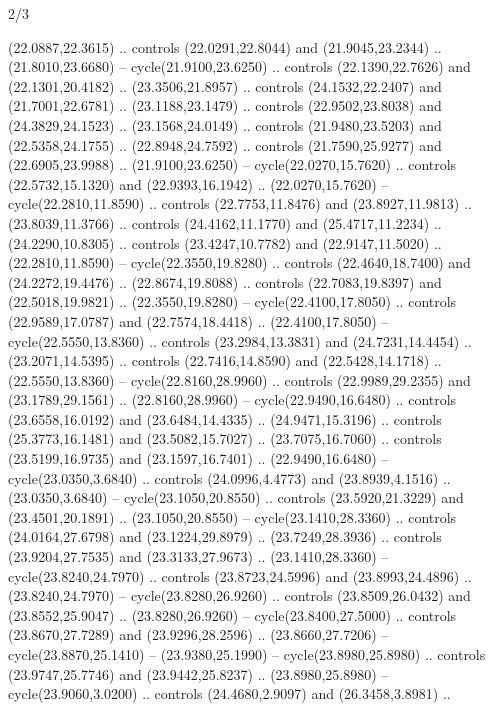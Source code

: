 \begin{flagdescription}{2/3}
\begin{scope}[yshift=\flagwidth,scale=\flagwidth/1241.93737]
\begin{scope}[y=-1mm, x=1mm,draw=gold,fill=blue,line join=miter,miter limit=4,line width=1.8\lw]
\begin{scope}[y=1mm, x=1mm, yscale=-1,shift={(573.68mm+\str,145.75)}]
\begin{scope}[scale=1.35,shift={(-9,-3)}]
\begin{scope}[scale=0.55]
\begin{scope}[scale=1.333]
    (22.0887,22.3615) .. controls (22.0291,22.8044) and (21.9045,23.2344) ..
    (21.8010,23.6680) -- cycle(21.9100,23.6250) .. controls (22.1390,22.7626) and
    (22.1301,20.4182) .. (23.3506,21.8957) .. controls (24.1532,22.2407) and
    (21.7001,22.6781) .. (23.1188,23.1479) .. controls (22.9502,23.8038) and
    (24.3829,24.1523) .. (23.1568,24.0149) .. controls (21.9480,23.5203) and
    (22.5358,24.1755) .. (22.8948,24.7592) .. controls (21.7590,25.9277) and
    (22.6905,23.9988) .. (21.9100,23.6250) -- cycle(22.0270,15.7620) .. controls
    (22.5732,15.1320) and (22.9393,16.1942) .. (22.0270,15.7620) --
    cycle(22.2810,11.8590) .. controls (22.7753,11.8476) and (23.8927,11.9813) ..
    (23.8039,11.3766) .. controls (24.4162,11.1770) and (25.4717,11.2234) ..
    (24.2290,10.8305) .. controls (23.4247,10.7782) and (22.9147,11.5020) ..
    (22.2810,11.8590) -- cycle(22.3550,19.8280) .. controls (22.4640,18.7400) and
    (24.2272,19.4476) .. (22.8674,19.8088) .. controls (22.7083,19.8397) and
    (22.5018,19.9821) .. (22.3550,19.8280) -- cycle(22.4100,17.8050) .. controls
    (22.9589,17.0787) and (22.7574,18.4418) .. (22.4100,17.8050) --
    cycle(22.5550,13.8360) .. controls (23.2984,13.3831) and (24.7231,14.4454) ..
    (23.2071,14.5395) .. controls (22.7416,14.8590) and (22.5428,14.1718) ..
    (22.5550,13.8360) -- cycle(22.8160,28.9960) .. controls (22.9989,29.2355) and
    (23.1789,29.1561) .. (22.8160,28.9960) -- cycle(22.9490,16.6480) .. controls
    (23.6558,16.0192) and (23.6484,14.4335) .. (24.9471,15.3196) .. controls
    (25.3773,16.1481) and (23.5082,15.7027) .. (23.7075,16.7060) .. controls
    (23.5199,16.9735) and (23.1597,16.7401) .. (22.9490,16.6480) --
    cycle(23.0350,3.6840) .. controls (24.0996,4.4773) and (23.8939,4.1516) ..
    (23.0350,3.6840) -- cycle(23.1050,20.8550) .. controls (23.5920,21.3229) and
    (23.4501,20.1891) .. (23.1050,20.8550) -- cycle(23.1410,28.3360) .. controls
    (24.0164,27.6798) and (23.1224,29.8979) .. (23.7249,28.3936) .. controls
    (23.9204,27.7535) and (23.3133,27.9673) .. (23.1410,28.3360) --
    cycle(23.8240,24.7970) .. controls (23.8723,24.5996) and (23.8993,24.4896) ..
    (23.8240,24.7970) -- cycle(23.8280,26.9260) .. controls (23.8509,26.0432) and
    (23.8552,25.9047) .. (23.8280,26.9260) -- cycle(23.8400,27.5000) .. controls
    (23.8670,27.7289) and (23.9296,28.2596) .. (23.8660,27.7206) --
    cycle(23.8870,25.1410) -- (23.9380,25.1990) -- cycle(23.8980,25.8980) ..
    controls (23.9747,25.7746) and (23.9442,25.8237) .. (23.8980,25.8980) --
    cycle(23.9060,3.0200) .. controls (24.4680,2.9097) and (26.3458,3.8981) ..

\end{scope}
\end{scope}
\end{scope}
\end{scope}
\end{scope}
\end{scope}
\end{flagdescription}
